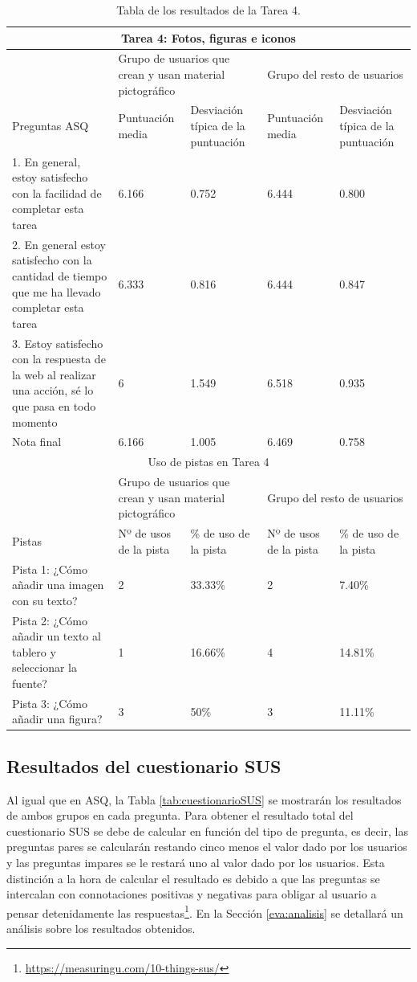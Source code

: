 \begin{table}

\begin{tabular}{ |p{4cm}|p{2cm}|p{2cm}|p{2cm}|p{2cm}|  }
	\hline
	\multicolumn{5}{|c|}{Tarea 4: Fotos, figuras e iconos} \\
	\hline
	& \multicolumn{2}{p{4cm}|}{Grupo de usuarios que crean y usan material pictográfico} & \multicolumn{2}{p{4cm}|}{Grupo del resto de usuarios }  \\ 
	\hline
	Preguntas ASQ & Puntuación media  &Desviación típica de la puntuación & Puntuación media & Desviación típica de la puntuación\\
	\hline
	1. En general, estoy satisfecho con la facilidad de completar esta tarea &6.166  &0.752 &6.444  &0.800\\
	\hline
	2. En general estoy satisfecho con la cantidad de tiempo que me ha llevado completar esta tarea &6.333  &0.816  &6.444 &0.847\\
	\hline
	3. Estoy satisfecho con la respuesta de la web al realizar una acción, sé lo que pasa en todo momento &6 &1.549 &6.518   &0.935\\
	\hline
	Nota final &6.166 &1.005 &6.469  &0.758\\
	\hline
	\multicolumn{5}{|c|}{Uso de pistas en Tarea 4} \\
	\hline
	& \multicolumn{2}{p{4cm}|}{Grupo de usuarios que crean y usan material pictográfico} & \multicolumn{2}{p{4cm}|}{Grupo del resto de usuarios }  \\ 
	\hline
	Pistas &Nº de usos de la pista &\% de uso de la pista&Nº de usos de la pista&\% de uso de la pista\\
	\hline
	Pista 1: ¿Cómo añadir una imagen con su texto? &2  &33.33\% &2 &7.40\%\\
	\hline
	Pista 2: ¿Cómo añadir un texto al tablero y seleccionar la fuente? &1 &16.66\%  &4 &14.81\%\\
	\hline
	Pista 3: ¿Cómo añadir una figura? &3 &50\% &3   &11.11\% \\
	\hline
\end{tabular}
\caption{\label{tab:area4respuestas}Tabla de los resultados de la Tarea 4.}
\end{table}

\subsection{Resultados del cuestionario SUS}
Al igual que en ASQ,  la Tabla \ref{tab:cuestionarioSUS} se mostrarán los resultados de ambos grupos en cada pregunta. Para obtener el resultado total del cuestionario SUS se debe de calcular en función del tipo de pregunta, es decir, las preguntas pares se calcularán restando cinco menos el valor dado por los usuarios y las preguntas impares se le restará uno al valor dado por los usuarios.  Esta distinción a la hora de calcular el resultado es debido a que las preguntas se intercalan con connotaciones positivas y negativas para obligar al usuario a pensar detenidamente las respuestas\footnote{\url{https://measuringu.com/10-things-sus/}}. En la Sección \ref{eva:analisis} se detallará un análisis sobre los resultados obtenidos. 



